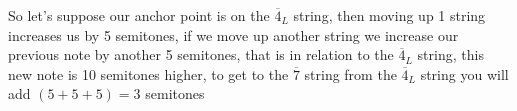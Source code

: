\documentclass[preview]{standalone}
\begin{document}
\begin{center}
So let's suppose our anchor point is on the $\overline{4}_L$ string, then moving up 1 string increases us by 5 semitones, if we move up another string we increase our previous note by another 5 semitones, that is in relation to the $\overline{4}_L$ string, this new note is 10 semitones higher, to get to the $\overline{7}$ string from the $\overline{4}_L$ string you will add $(5 + 5 + 5) = 3$ semitones
\end{center}
\end{document}

